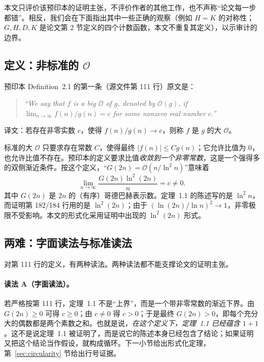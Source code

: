 \documentclass[11pt,a4paper]{ctexart}
\theoremstyle{plain}
\theoremstyle{definition}
\begin{document}
本文只评价该预印本的证明主张，不评价作者的其他工作，也不声称“论文每一步都错”。相反，我们会在下面指出其中一些正确的观察（例如 $H=K$ 的对称性；$G,H,D,K$ 是论文第 2 节定义的四个计数函数，本文不重复其定义），以示审计的边界。

\subsection{定义：非标准的 $\mathcal O$}
\label{sec:paper-def}

预印本 Definition~2.1 的第一条（源文件第 111 行）原文是：

\begin{quote}\itshape
“We say that $f$ is a big $\mathcal O$ of $g$, denoted by $\mathcal O(g)$, if
$\lim_{n\to\infty} f(n)/g(n)=c$ for some nonzero real number $c$.”
\end{quote}

\noindent 译文：若存在非零实数 $c$，使得 $f(n)/g(n)\to c$，则称 $f$ 是 $g$ 的大 $\mathcal O$。

标准的大 $\mathcal O$ 只要求存在常数 $C$，使得最终 $|f(n)|\le C g(n)$；它允许比值为 $0$，也允许比值不存在。预印本的定义要求比值\emph{收敛到一个非零常数}，这是一个强得多的双侧渐近条件。按这个定义，“$G(2n)=\mathcal O(n/\ln^2 n)$”意味着
\begin{equation}
\lim_{n\to\infty}\frac{G(2n)\ln^2(2n)}{n}=c\ne0.
\label{eq:paperO}
\end{equation}
其中 $G(2n)$ 是 $2n$ 的（有序）哥德巴赫表示数。定理~1.1 的陈述写的是 $\ln^2 n$，而证明第 182/184 行用的是 $\ln^2(2n)$；由于 $(\ln(2n)/\ln n)^2\to1$，非零极限不受影响。本文的形式化采用证明中出现的 $\ln^2(2n)$ 形式。

\subsection{两难：字面读法与标准读法}
\label{sec:dilemma}

对第 111 行的定义，有两种读法。两种读法都不能支撑论文的证明主张。

\paragraph{读法 A（字面读法）。}
若严格按第 111 行，定理~1.1 不是“上界”，而是一个带非零常数的渐近下界。由 $G(2n)\ge0$ 可得 $c\ge0$；由 $c\ne0$ 得 $c>0$；于是最终 $G(2n)>0$，即每个充分大的偶数都是两个素数之和。也就是说，\emph{在这个定义下，定理~1.1 已经蕴含 $1+1$}。这不是说定理~1.1 被证明了，而是说它的陈述本身已经包含了结论；如果证明又把这个结论当作假设，就构成循环。下一小节给出形式化定理，第~\ref{sec:circularity} 节给出行号证据。
\end{document}
